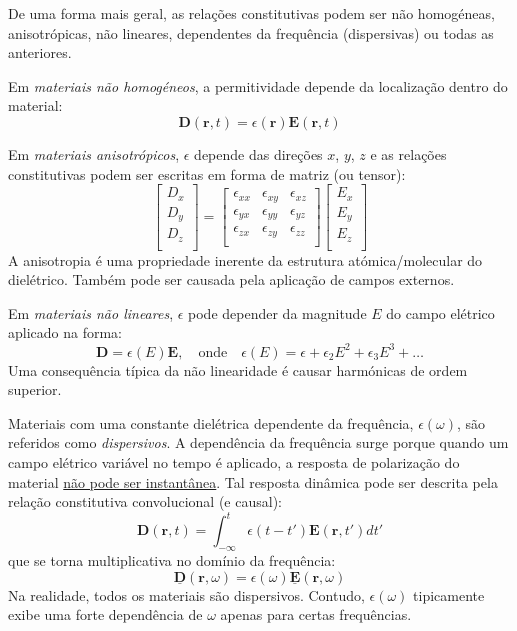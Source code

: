 
De uma forma mais geral, as relações constitutivas podem ser não homogéneas, anisotrópicas, não lineares, dependentes da frequência (dispersivas) ou todas as anteriores. 

Em \textit{materiais não homogéneos}, a permitividade depende da localização dentro do material:
$$
    \mathbf{D}(\mathbf{r},t) = \epsilon(\mathbf{r}) \mathbf{E}(\mathbf{r},t)
$$

Em \textit{materiais anisotrópicos}, $\epsilon$ depende das direções $x$, $y$, $z$ e as relações constitutivas podem ser escritas em forma de matriz (ou tensor):
$$
    \begin{bmatrix}
        D_x \\
        D_y \\
        D_z \\
    \end{bmatrix} =
    \begin{bmatrix}
        \epsilon_{xx} & \epsilon_{xy} & \epsilon_{xz} \\
        \epsilon_{yx} & \epsilon_{yy} & \epsilon_{yz} \\
        \epsilon_{zx} & \epsilon_{zy} & \epsilon_{zz} \\
    \end{bmatrix}
    \begin{bmatrix}
        E_x \\
        E_y \\
        E_z \\
    \end{bmatrix}
$$
A anisotropia é uma propriedade inerente da estrutura atómica/molecular do dielétrico. Também pode ser causada pela aplicação de campos externos.

Em \textit{materiais não lineares}, $\epsilon$ pode depender da magnitude  $E$ do campo elétrico aplicado na forma:
$$
    \mathbf{D} = \epsilon (E) \mathbf{E}, \quad \text{onde} \quad \epsilon(E) = \epsilon + \epsilon_2 E^2 + \epsilon_3 E^3 + \ldots
$$
Uma consequência típica da não linearidade é causar harmónicas de ordem superior.

Materiais com uma constante dielétrica dependente da frequência, $\epsilon(\omega)$, são referidos como \textit{dispersivos}. A dependência da frequência surge porque quando um campo elétrico variável no tempo é aplicado, a resposta de polarização do material \underline{não pode ser instantânea}. Tal resposta dinâmica pode ser descrita pela relação constitutiva convolucional (e causal):
$$
    \mathbf{D}(\mathbf{r}, t) = \int_{-\infty}^{t} \epsilon(t - t') \mathbf{E}(\mathbf{r}, t') dt'
$$
que se torna multiplicativa no domínio da frequência:
$$
    \underline{\mathbf{D}}(\mathbf{r}, \omega) = \epsilon(\omega) \underline{\mathbf{E}}(\mathbf{r}, \omega)
$$
Na realidade, todos os materiais são dispersivos. Contudo, $\epsilon(\omega)$ tipicamente exibe uma forte dependência de $\omega$ apenas para certas frequências. 


